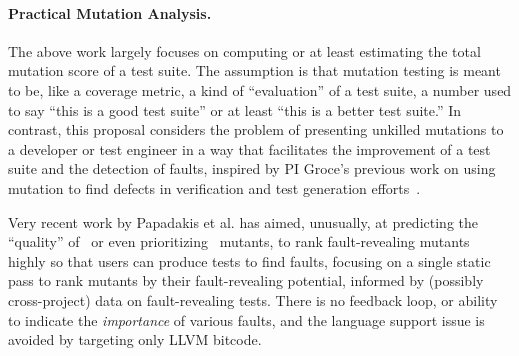 \paragraph{Practical Mutation Analysis.}
%
The above work largely focuses on computing or at least estimating the
total mutation score of a
test suite.  The assumption is that mutation testing is
meant to be, like a coverage metric, a kind of ``evaluation'' of a
test suite, a number used to say ``this is a good test suite'' or at
least ``this is a better test suite.''  In contrast,
this proposal considers the problem of presenting unkilled mutations to
a developer or test engineer in a way that facilitates the improvement
of a test suite and the detection of faults, inspired by PI Groce's
previous work on using mutation to find defects in verification
and test generation
efforts~\cite{groce2015verified,groce2018verified,mutKernel}.

Very recent work by Papadakis et al. has
aimed, unusually, at predicting the ``quality'' of~\cite{MutQuality}
or even prioritizing~\cite{FaRM} mutants, to rank fault-revealing
mutants highly so that users can produce tests to find faults, focusing on a single static
pass to rank mutants by their fault-revealing potential, informed by
(possibly cross-project)
data on fault-revealing tests.  There is no feedback loop, or ability
to indicate the \emph{importance} of various faults, and the language
support issue is avoided by targeting only LLVM
bitcode.  %

